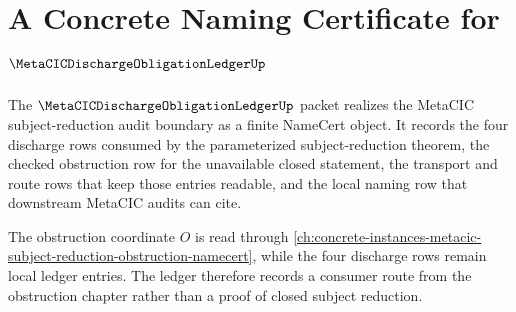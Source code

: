 \chapter{A Concrete Naming Certificate for $\MetaCICDischargeObligationLedgerUp$}
\label{ch:concrete-instances-metacic-discharge-obligation-ledger-namecert}

The $\MetaCICDischargeObligationLedgerUp$ packet realizes the MetaCIC subject-reduction audit boundary as a finite NameCert object. It records the four discharge rows consumed by the parameterized subject-reduction theorem, the checked obstruction row for the unavailable closed statement, the transport and route rows that keep those entries readable, and the local naming row that downstream MetaCIC audits can cite.

The obstruction coordinate $O$ is read through \autoref{ch:concrete-instances-metacic-subject-reduction-obstruction-namecert}, while the four discharge rows remain local ledger entries. The ledger therefore records a consumer route from the obstruction chapter rather than a proof of closed subject reduction.

